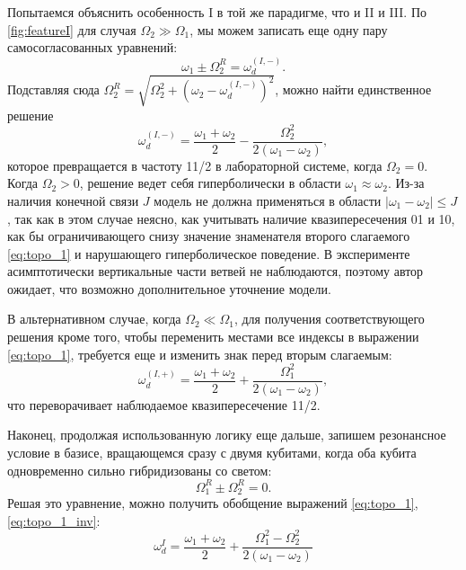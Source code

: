 \documentclass[14pt, a4paper]{extreport}
\numberwithin{equation}{section}
\begin{document}
Попытаемся объяснить особенность I в той же парадигме, что и II и III. По \autoref{fig:featureI} для случая $\Omega_2 \gg \Omega_1$, мы можем записать еще одну пару самосогласованных уравнений:
\begin{equation}
\omega_{1} \pm \Omega_2^R = \omega_d^{(I, -)}.
\end{equation}
Подставляя сюда $\Omega_2^R = \sqrt{\Omega_2^2 + \left(\omega_2 - \omega_d^{(I, -)}\right)^2}$, можно найти единственное решение
\begin{equation}
\omega_d^{(I, -)} = \frac{\omega_1 + \omega_2}{2} - \frac{ \Omega_{2}^{2}}{2 \left(\omega_{1} - \omega_{2}\right)},
\label{eq:topo_1}
\end{equation}
которое превращается в частоту 11/2 в лабораторной системе, когда $\Omega_2 = 0$. Когда $\Omega_2 > 0$, решение ведет себя гиперболически в области $\omega_1 \approx \omega_2$. Из-за наличия конечной связи $J$ модель не должна применяться в области $|\omega_1-\omega_2|\leq J$, так как в этом случае неясно, как учитывать наличие квазипересечения 01 и 10, как бы ограничивающего снизу значение знаменателя второго слагаемого \eqref{eq:topo_1} и нарушающего гиперболическое поведение. В эксперименте асимптотически вертикальные части ветвей не наблюдаются, поэтому автор ожидает, что возможно дополнительное уточнение модели.

В альтернативном случае, когда $\Omega_2 \ll \Omega_1$, для получения соответствующего решения кроме того, чтобы переменить местами все индексы в выражении \eqref{eq:topo_1}, требуется еще и изменить знак перед вторым слагаемым:
\begin{equation}
\omega_d^{(I,+)} = \frac{\omega_1 + \omega_2}{2} + \frac{ \Omega_{1}^{2}}{2 \left(\omega_{1} - \omega_{2}\right)},
\label{eq:topo_1_inv}
\end{equation}
что переворачивает наблюдаемое квазипересечение 11/2.

Наконец, продолжая использованную логику еще дальше, запишем резонансное условие в базисе, вращающемся сразу с двумя кубитами, когда оба кубита одновременно сильно гибридизованы со светом:
\begin{equation}
\Omega_1^R \pm \Omega_2^R = 0.
\label{eq:zero-photon}
\end{equation}
Решая это уравнение, можно получить обобщение выражений \eqref{eq:topo_1}, \eqref{eq:topo_1_inv}:
\begin{equation}
\omega_d^I = \frac{\omega_{1} + \omega_{2}}{2} + \frac{\Omega_{1}^{2} - \Omega_{2}^{2}}{ 2\left(\omega_{1} - \omega_{2}\right)}
\label{eq:topo_comm}
\end{equation}
\end{document}
